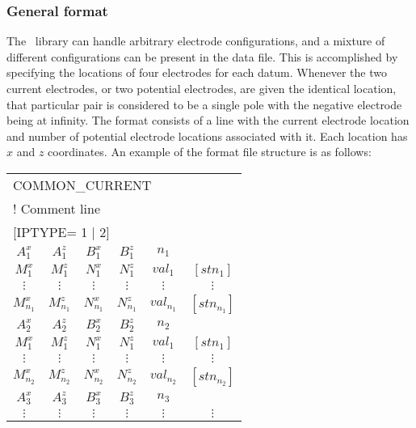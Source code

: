 \subsubsection*{General format}
The \prog~library can handle arbitrary electrode configurations, and a mixture of different configurations can be present in the data file. This is accomplished by specifying the locations of four electrodes for each datum. Whenever the two current electrodes, or two potential electrodes, are given the identical location, that particular pair is considered to be a single pole with the negative electrode being at infinity. The format consists of a line with the current electrode location and number of potential electrode locations associated with it. Each location has $x$ and $z$ coordinates. An example of the  format file structure is as follows:

\begin{fileExample}
\begin{tabular}{|cccccc|}
\hline
\multicolumn{6}{|l|}{COMMON\_CURRENT} \\
\multicolumn{6}{|l|}{! Comment line} \\
\multicolumn{6}{|l|}{[IPTYPE= 1 | 2]} \\
$A_1^x$ & $A_1^z$ & $B_1^x$ & $B_1^z$ & $n_1$ & \\
$M_1^x$ &  $M_1^z$ & $N_1^x$  & $N_1^z$ & $val_1$ & $[stn_1]$ \\
$\vdots$ &  $\vdots$ & $\vdots$  & $\vdots$ & $\vdots$ & $\vdots$\\
$M_{n_1}^x$ & $M_{n_1}^z$ & $N_{n_1}^x$ &  $N_{n_1}^z$ & $val_{n_1}$ & $[stn_{n_1}]$ \\ 
$A_2^x$ &  $A_2^z$ & $B_2^x$ & $B_2^z$ & $n_2$ & \\
$M_1^x$ &  $M_1^z$ & $N_1^x$ & $N_1^z$ & $val_1$ & $[stn_1]$ \\
$\vdots$ &  $\vdots$ & $\vdots$ & $\vdots$ & $\vdots$ & $\vdots$\\
$M_{n_2}^x$  & $M_{n_2}^z$ & $N_{n_2}^x$ &  $N_{n_2}^z$ & $val_{n_2}$ & $[stn_{n_2}]$ \\ 
$A_3^x$ &  $A_3^z$ & $B_3^x$ & $B_3^z$ & $n_3$ & \\
$\vdots$ & $\vdots$ & $\vdots$ & $\vdots$ & $\vdots$ & $\vdots$\\
\hline
\end{tabular}
\end{fileExample}

